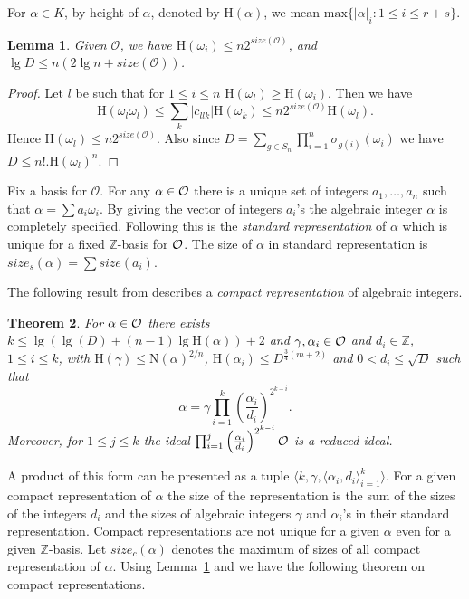 \documentclass{article}
\newcommand{\height}[1]{\mathrm{H}\left(#1\right)}
\newcommand{\Norm}[1]{\mathrm{N}\left(#1\right)}
\newcommand{\Height}[1]{\ensuremath{\mathrm{H}(#1)}}
\newtheorem{theorem}{Theorem}[section]
\newtheorem{lemma}[theorem]{Lemma}
\theoremstyle{definition}\newtheorem{remark}[theorem]{Remark}
\newcommand {\abs} [1] {\ensuremath{\left\vert#1\right\vert}}
\begin{document}
For $\alpha \in K$, by height of $\alpha$, denoted by
$\Height{\alpha}$, we mean $\textrm{max}\{ \abs{\alpha}_i: 1 \leq i
\leq r+s\}$.
\begin{lemma}\label{lem-bounds}
Given $\mathcal{O}$, we have $\Height{\omega_i} \leq n
2^{size(\mathcal{O})}$, and $\lg{D} \leq n(2\lg{n} +
size(\mathcal{O}))$.
\end{lemma}
\begin{proof}
  Let $l$ be such that for $1 \leq i \leq n$ $\Height{\omega_l} \geq
  \Height{\omega_i}$.  Then we have
  \[
  \Height{\omega_l\omega_l} \leq \sum_k \abs{c_{llk}}
  \Height{\omega_k} \leq n 2^{size(\mathcal{O})}\Height{\omega_l}.
  \]
  Hence $\Height{\omega_l} \leq n 2^{size(\mathcal{O})}$. Also since
  $D = \sum_{g \in S_n} \prod_{i=1}^n \sigma_{g(i)}(\omega_i)$ we have
  $D \leq n!.\Height{\omega_l}^n$.
\end{proof}

Fix a basis for $\mathcal{O}$. For any $\alpha\in \cal{O}$ there is a
unique set of integers $a_1,\ldots,a_n$ such that $\alpha = \sum a_i
\omega_i$.  By giving the vector of integers $a_i$'s the algebraic
integer $\alpha$ is completely specified. Following
\cite{thiel94class} this is the \emph{standard representation} of
$\alpha$ which is unique for a fixed $\mathbb{Z}$-basis for $\cal{O}$.
The size of $\alpha$ in standard representation is
$size_s(\alpha)=\sum size(a_i)$.

The following result from \cite{thiel94class} describes a
\emph{compact representation} of algebraic integers.

\begin{theorem}\label{thm-compact}
  For $\alpha \in \cal{O}$ there exists $k \leq \lg (\lg(D) + (n-1)
  \lg \height{\alpha}) + 2$ and $\gamma,\alpha_i\in \cal{O}$ and $d_i
  \in \mathbb{Z}$, $1\leq i \leq k$, with $\height{\gamma} \leq
  \Norm{\alpha}^{2/n}$, $\height{\alpha_i} \leq D^{\frac{3}{4}(m+2)}$
  and $0 < d_i \leq \sqrt{D}$ such that
  \[
  \alpha = \gamma \prod_{i=1}^k \left(\frac{\alpha_i}{d_i}\right)^{2^{k-i}}.
  \]
  Moreover, for $1 \leq j \leq k$ the ideal $\prod_{i=1}^j
  \left(\frac{\alpha_i}{d_i}\right)^{2^{k-i}}\cal{O}$ is a reduced
  ideal.
\end{theorem}

A product of this form can be presented as a tuple $\langle k,
\gamma,{\langle\alpha_i,d_i\rangle}_{i=1}^k\rangle$. For a given
compact representation of $\alpha$ the size of the representation is
the sum of the sizes of the integers $d_i$ and the sizes of algebraic
integers $\gamma$ and $\alpha_i$'s in their standard representation.
Compact representations are not unique for a given $\alpha$ even for a
given $\mathbb{Z}$-basis. Let $size_c(\alpha)$ denotes the maximum of
sizes of all compact representation of $\alpha$. Using
Lemma~\ref{lem-bounds} and \cite[Corollary 15]{thiel94class} we have
the following theorem on compact representations.
\end{document}
